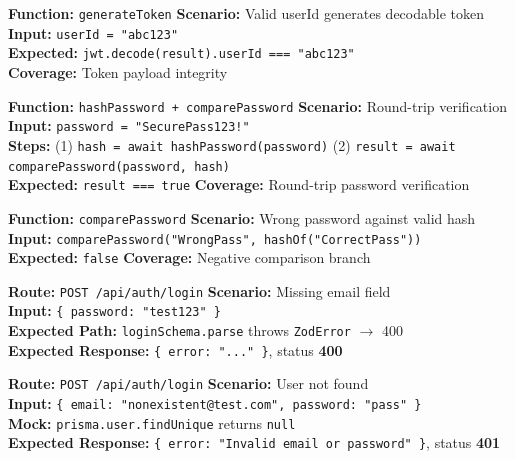 ﻿\documentclass[12pt,a4paper]{report}
\newcommand{\pone}{\textbf{\color{p1red}P1}}
\begin{document}
\begin{tcolorbox}[testbox,title={AUTH-008 \hfill \pone}]
\textbf{Function:} \texttt{generateToken} \quad \textbf{Scenario:} Valid userId generates decodable token \\
\textbf{Input:} \texttt{userId = "abc123"} \\
\textbf{Expected:} \texttt{jwt.decode(result).userId === "abc123"} \\
\textbf{Coverage:} Token payload integrity
\end{tcolorbox}

\begin{tcolorbox}[testbox,title={AUTH-009 \hfill \pone}]
\textbf{Function:} \texttt{hashPassword + comparePassword} \quad \textbf{Scenario:} Round-trip verification \\
\textbf{Input:} \texttt{password = "SecurePass123!"} \\
\textbf{Steps:} (1) \texttt{hash = await hashPassword(password)} \quad (2) \texttt{result = await comparePassword(password, hash)} \\
\textbf{Expected:} \texttt{result === true} \quad \textbf{Coverage:} Round-trip password verification
\end{tcolorbox}

\begin{tcolorbox}[testbox,title={AUTH-010 \hfill \pone}]
\textbf{Function:} \texttt{comparePassword} \quad \textbf{Scenario:} Wrong password against valid hash \\
\textbf{Input:} \texttt{comparePassword("WrongPass", hashOf("CorrectPass"))} \\
\textbf{Expected:} \texttt{false} \quad \textbf{Coverage:} Negative comparison branch
\end{tcolorbox}

\begin{tcolorbox}[testbox,title={AUTH-011 \hfill \pone}]
\textbf{Route:} \texttt{POST /api/auth/login} \quad \textbf{Scenario:} Missing email field \\
\textbf{Input:} \texttt{\{ password: "test123" \}} \\
\textbf{Expected Path:} \texttt{loginSchema.parse} throws \texttt{ZodError} $\to$ 400 \\
\textbf{Expected Response:} \texttt{\{ error: "..." \}}, status \textbf{400}
\end{tcolorbox}

\begin{tcolorbox}[testbox,title={AUTH-012 \hfill \pone}]
\textbf{Route:} \texttt{POST /api/auth/login} \quad \textbf{Scenario:} User not found \\
\textbf{Input:} \texttt{\{ email: "nonexistent@test.com", password: "pass" \}} \\
\textbf{Mock:} \texttt{prisma.user.findUnique} returns \texttt{null} \\
\textbf{Expected Response:} \texttt{\{ error: "Invalid email or password" \}}, status \textbf{401}
\end{tcolorbox}
\end{document}
